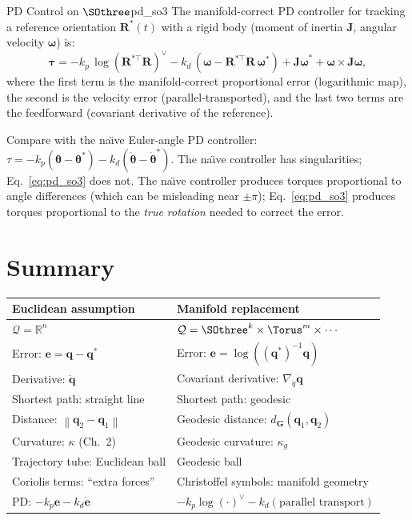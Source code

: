 \documentclass[12pt, openany]{book}
\theoremstyle{plain}
\newcommand{\configspace}{\mathcal{Q}}
\newcommand{\Reals}{\mathbb{R}}
\newcommand{\norm}[1]{\left\lVert #1 \right\rVert}
\begin{document}
\begin{example}{PD Control on $\SOthree$}{pd_so3}
  The manifold-correct PD controller for tracking a reference orientation
  $\bm{R}^*(t)$ with a rigid body (moment of inertia $\bm{J}$,
  angular velocity $\bm{\omega}$) is:
  \begin{equation}\label{eq:pd_so3}
    \bm{\tau} = -k_p\, \log(\bm{R}^{*\top}\bm{R})^\vee
    - k_d\, (\bm{\omega} - \bm{R}^{*\top}\bm{R}\,\bm{\omega}^*)
    + \bm{J}\dot{\bm{\omega}}^* + \bm{\omega} \times \bm{J}\bm{\omega},
  \end{equation}
  where the first term is the manifold-correct proportional error
  (logarithmic map), the second is the velocity error (parallel-transported),
  and the last two terms are the feedforward (covariant derivative of the
  reference).

  Compare with the na\"{\i}ve Euler-angle PD controller:
  $\tau = -k_p(\bm{\theta} - \bm{\theta}^*) - k_d(\dot{\bm{\theta}} - \dot{\bm{\theta}}^*)$.
  The na\"{\i}ve controller has singularities; Eq.~\eqref{eq:pd_so3} does not.
  The na\"{\i}ve controller produces torques proportional to angle differences
  (which can be misleading near $\pm\pi$); Eq.~\eqref{eq:pd_so3} produces
  torques proportional to the \emph{true rotation} needed to correct the error.
\end{example}

\section{Summary}

\begin{center}
\renewcommand{\arraystretch}{1.4}
\begin{tabular}{@{} l l @{}}
  \toprule
  \textbf{Euclidean assumption} & \textbf{Manifold replacement} \\
  \midrule
  $\configspace = \Reals^n$ & $\configspace = \SOthree^k \times \Torus^m \times \cdots$ \\
  Error: $\bm{e} = \bm{q} - \bm{q}^*$ & Error: $\bm{e} = \log((\bm{q}^*)^{-1}\bm{q})$ \\
  Derivative: $\ddot{\bm{q}}$ & Covariant derivative: $\nabla_{\dot{q}}\dot{\bm{q}}$ \\
  Shortest path: straight line & Shortest path: geodesic \\
  Distance: $\norm{\bm{q}_2 - \bm{q}_1}$ & Geodesic distance: $d_{\bm{G}}(\bm{q}_1, \bm{q}_2)$ \\
  Curvature: $\kappa$ (Ch.~2) & Geodesic curvature: $\kappa_g$ \\
  Trajectory tube: Euclidean ball & Geodesic ball \\
  Coriolis terms: ``extra forces'' & Christoffel symbols: manifold geometry \\
  PD: $-k_p\bm{e} - k_d\dot{\bm{e}}$ & $-k_p\log(\cdot)^\vee - k_d(\text{parallel transport})$ \\
  \bottomrule
\end{tabular}
\end{center}
\end{document}

